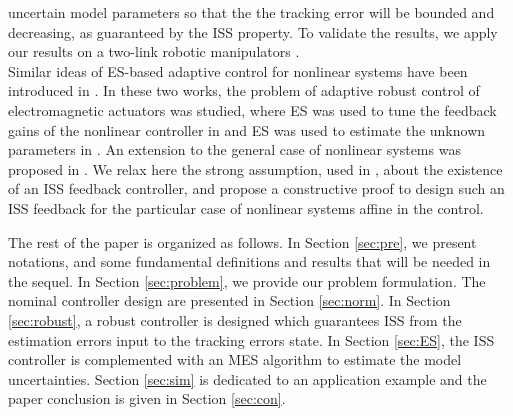 \documentclass[twoside,leqno,onecolumn]{article}
\begin{document}
uncertain model parameters so that the the tracking error will be
bounded and decreasing, as guaranteed by the ISS property. To
validate the results, we apply our results on a two-link robotic
manipulators \cite{Spong92}.\\ Similar ideas of ES-based adaptive
control for nonlinear systems have been introduced in
\cite{Beno13,Atinc13}. In these two works, the problem of adaptive
robust control of electromagnetic actuators was studied, where ES
was used to tune the feedback gains of the nonlinear controller in
\cite{Beno13} and ES was used to estimate the unknown parameters
in \cite{Atinc13}. An extension to the general case of nonlinear
systems was proposed in \cite{ben_ifac14,ben_ECC14}. We relax here
the strong assumption, used in \cite{ben_ifac14,ben_ECC14}, about
the existence of an ISS feedback controller, and propose a
constructive proof to design such an ISS feedback for the
particular case of nonlinear systems affine in the control.






The rest of the paper is organized as follows. In Section
\ref{sec:pre}, we present notations, and some fundamental
definitions and results that will be needed in the sequel. In
Section \ref{sec:problem}, we provide our problem formulation. The
nominal controller design are presented in Section \ref{sec:norm}.
In Section \ref{sec:robust}, a robust controller is designed which
guarantees ISS from the estimation errors input to the tracking
errors state. In Section \ref{sec:ES}, the ISS controller is
complemented with an MES algorithm to estimate the model
uncertainties. Section \ref{sec:sim} is dedicated to an
application example and the paper conclusion is given in Section
\ref{sec:con}.
\end{document}
